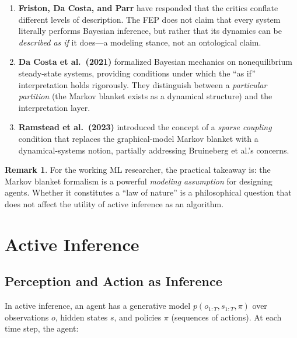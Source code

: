\documentclass[11pt,a4paper]{article}
\theoremstyle{definition}
\newtheorem{remark}[theorem]{Remark}
\begin{document}
\begin{enumerate}[leftmargin=2em]
  \item \textbf{Friston, Da Costa, and Parr} have responded that the critics
    conflate different levels of description.  The FEP does not claim that
    every system literally performs Bayesian inference, but rather that its
    dynamics can be \emph{described as if} it does---a modeling stance, not an
    ontological claim.
  \item \textbf{Da Costa et al.\ (2021)} formalized Bayesian mechanics on
    nonequilibrium steady-state systems, providing conditions under which the
    ``as if'' interpretation holds rigorously.  They distinguish between a
    \emph{particular partition} (the Markov blanket exists as a dynamical
    structure) and the interpretation layer.
  \item \textbf{Ramstead et al.\ (2023)} introduced the concept of a
    \emph{sparse coupling} condition that replaces the graphical-model Markov
    blanket with a dynamical-systems notion, partially addressing Bruineberg
    et al.'s concerns.
\end{enumerate}

\begin{remark}
For the working ML researcher, the practical takeaway is: the Markov blanket
formalism is a powerful \emph{modeling assumption} for designing agents.
Whether it constitutes a ``law of nature'' is a philosophical question that
does not affect the utility of active inference as an algorithm.
\end{remark}


\section{Active Inference}
\label{sec:aif}

\subsection{Perception and Action as Inference}

In active inference, an agent has a generative model
$p(o_{1:T}, s_{1:T}, \pi)$ over observations $o$, hidden states $s$, and
policies $\pi$ (sequences of actions).  At each time step, the agent:
\end{document}
